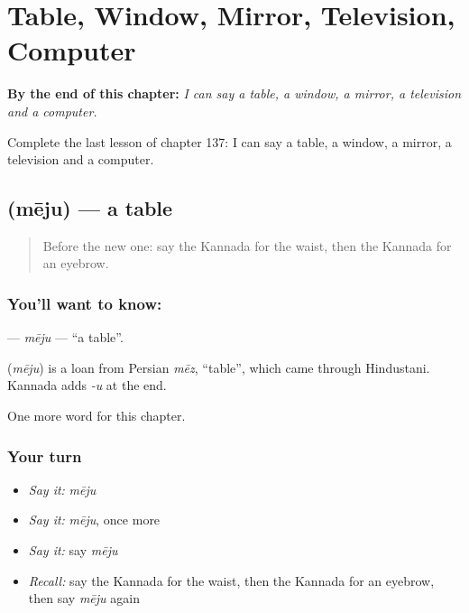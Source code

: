 
\chapter{Table, Window, Mirror, Television, Computer}
\label{ch:ka-table-window-mirror-television-computer}

\begin{chapteropening}
\textbf{By the end of this chapter:} \emph{I can say a table, a window, a mirror, a television and a computer.}

Complete the last lesson of chapter 137: I can say a table, a window, a mirror, a television and a computer.
\end{chapteropening}

\section[\texorpdfstring{\kn{ಮೇಜು} (mēju)}{ಮೇಜು (mēju)}]{ (mēju) — a table}

\label{lesson:KA-C137-meju}



\begin{quote}
Before the new one: say the Kannada for the waist, then the Kannada for an eyebrow.
\end{quote}

\subsection*{You'll want to know: }
\textbf{} — \emph{mēju} — \textquotedblleft{}a table\textquotedblright{}.

\begin{cousinweb}
\textbf{} (\emph{mēju}) is a loan from Persian \emph{mēz}, \textquotedblleft{}table\textquotedblright{}, which came through Hindustani. Kannada adds \emph{-u} at the end.
\end{cousinweb}

\begin{grammarlens}[title={What you've built}]
One more word for this chapter.
\end{grammarlens}

\subsection*{Your turn}
\begin{itemize}
\raggedright
  \item \emph{Say it:} \emph{mēju}
  \item \emph{Say it:} \emph{mēju}, once more
  \item \emph{Say it:} say \emph{mēju}
  \item \emph{Recall:} say the Kannada for the waist, then the Kannada for an eyebrow, then say \emph{mēju} again
\end{itemize}

